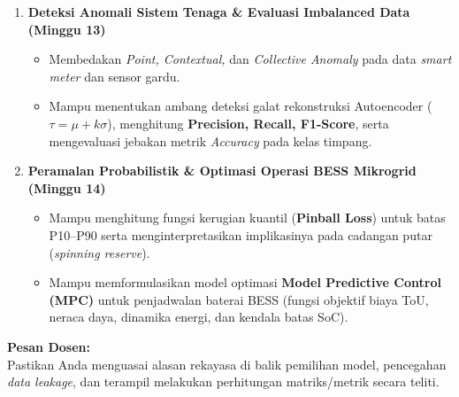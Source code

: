 \documentclass[11pt,a4paper]{article}
\begin{document}
\begin{enumerate}[label=\textbf{\arabic*.}, leftmargin=1.5em, itemsep=7pt]
    \item \textbf{Deteksi Anomali Sistem Tenaga \& Evaluasi Imbalanced Data (Minggu 13)}
    \begin{itemize}[label=$\circ$]
        \item Membedakan \textit{Point, Contextual,} dan \textit{Collective Anomaly} pada data \textit{smart meter} dan sensor gardu.
        \item Mampu menentukan ambang deteksi galat rekonstruksi Autoencoder ($\tau = \mu + k\sigma$), menghitung \textbf{Precision, Recall, F1-Score}, serta mengevaluasi jebakan metrik \textit{Accuracy} pada kelas timpang.
    \end{itemize}

    \item \textbf{Peramalan Probabilistik \& Optimasi Operasi BESS Mikrogrid (Minggu 14)}
    \begin{itemize}[label=$\circ$]
        \item Mampu menghitung fungsi kerugian kuantil (\textbf{Pinball Loss}) untuk batas P10--P90 serta menginterpretasikan implikasinya pada cadangan putar (\textit{spinning reserve}).
        \item Mampu memformulasikan model optimasi \textbf{Model Predictive Control (MPC)} untuk penjadwalan baterai BESS (fungsi objektif biaya ToU, neraca daya, dinamika energi, dan kendala batas SoC).
    \end{itemize}
\end{enumerate}

\vspace{0.3cm}
\begin{center}
    \colorbox{goldaccent}{\parbox{0.92\textwidth}{\centering\textbf{\color{white}Pesan Dosen:}\\ \small Pastikan Anda menguasai alasan rekayasa di balik pemilihan model, pencegahan \textit{data leakage}, dan terampil melakukan perhitungan matriks/metrik secara teliti.}}
\end{center}
\end{document}
